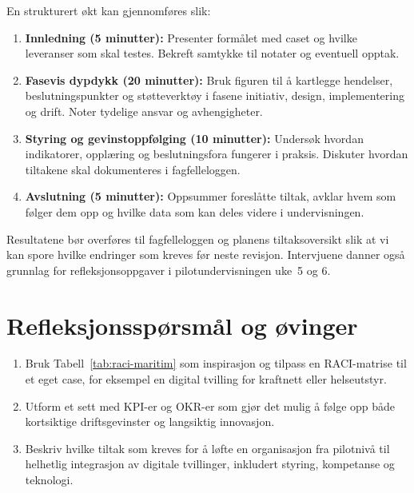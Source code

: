 En strukturert økt kan gjennomføres slik:
\begin{enumerate}
    \item \textbf{Innledning (5 minutter):} Presenter formålet med caset og hvilke leveranser som skal testes. Bekreft samtykke til notater og eventuell opptak.
    \item \textbf{Fasevis dypdykk (20 minutter):} Bruk figuren til å kartlegge hendelser, beslutningspunkter og støtteverktøy i fasene initiativ, design, implementering og drift. Noter tydelige ansvar og avhengigheter.
    \item \textbf{Styring og gevinstoppfølging (10 minutter):} Undersøk hvordan indikatorer, opplæring og beslutningsfora fungerer i praksis. Diskuter hvordan tiltakene skal dokumenteres i fagfelleloggen.
    \item \textbf{Avslutning (5 minutter):} Oppsummer foreslåtte tiltak, avklar hvem som følger dem opp og hvilke data som kan deles videre i undervisningen.
\end{enumerate}

Resultatene bør overføres til fagfelleloggen og planens tiltaksoversikt slik at vi kan spore hvilke endringer som kreves før neste revisjon. Intervjuene danner også grunnlag for refleksjonsoppgaver i pilotundervisningen uke~5 og 6.

\section{Refleksjonsspørsmål og øvinger}
\begin{enumerate}
    \item Bruk Tabell~\ref{tab:raci-maritim} som inspirasjon og tilpass en RACI-matrise til et eget case, for eksempel en digital tvilling for kraftnett eller helseutstyr.
    \item Utform et sett med KPI-er og OKR-er som gjør det mulig å følge opp både kortsiktige driftsgevinster og langsiktig innovasjon.
    \item Beskriv hvilke tiltak som kreves for å løfte en organisasjon fra pilotnivå til helhetlig integrasjon av digitale tvillinger, inkludert styring, kompetanse og teknologi.
\end{enumerate}
